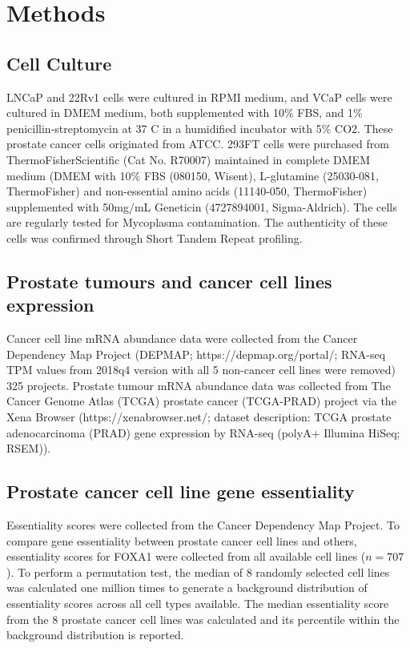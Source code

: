 \section{Methods}
\label{sec:FOXA1_methods}

\subsection{Cell Culture}

LNCaP and 22Rv1 cells were cultured in RPMI medium, and VCaP cells were cultured in DMEM medium, both supplemented with 10\% FBS, and 1\% penicillin-streptomycin at 37 \textdegree C in a humidified incubator with 5\% CO2.
These prostate cancer cells originated from ATCC.
293FT cells were purchased from ThermoFisherScientific (Cat No. R70007) maintained in complete DMEM medium (DMEM with 10\% FBS (080150, Wisent), L-glutamine (25030-081, ThermoFisher) and non-essential amino acids (11140-050, ThermoFisher) supplemented with 50mg/mL Geneticin (4727894001, Sigma-Aldrich).
The cells are regularly tested for Mycoplasma contamination.
The authenticity of these cells was confirmed through Short Tandem Repeat profiling.

\subsection{Prostate tumours and cancer cell lines expression}

Cancer cell line mRNA abundance data were collected from the Cancer Dependency Map Project (DEPMAP; https://depmap.org/portal/; RNA-seq TPM values from 2018q4 version with all 5 non-cancer cell lines were removed) 325 projects.
Prostate tumour mRNA abundance data was collected from The Cancer Genome Atlas (TCGA) prostate cancer (TCGA-PRAD) project via the Xena Browser (https://xenabrowser.net/; dataset description: TCGA prostate adenocarcinoma (PRAD) gene expression by RNA-seq (polyA+ Illumina HiSeq; RSEM)).

\subsection{Prostate cancer cell line gene essentiality}

Essentiality scores were collected from the Cancer Dependency Map Project.
To compare gene essentiality between prostate cancer cell lines and others, essentiality scores for FOXA1 were collected from all available cell lines ($n = 707$).
To perform a permutation test, the median of 8 randomly selected cell lines was calculated one million times to generate a background distribution of essentiality scores across all cell types available.
The median essentiality score from the 8 prostate cancer cell lines was calculated and its percentile within the background distribution is reported.


